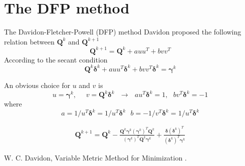 \documentclass{beamer}
\begin{document}
\section{The DFP method}
\begin{frame}{The Davidon-Fletcher-Powell (DFP) method}
Davidon proposed the following relation between $\boldsymbol{Q}^k$ and $\boldsymbol{Q}^{k+1}$
\begin{equation*}
    \boldsymbol{Q}^{k+1} = \boldsymbol{Q}^{k} + a uu^T + bvv^T
\end{equation*}
According to the secant condition
\begin{equation*}
    \boldsymbol{Q}^{k} \boldsymbol{\delta}^k + a uu^T\boldsymbol{\delta}^k + bvv^T\boldsymbol{\delta}^k = \boldsymbol{\gamma}^{k} 
\end{equation*}

An obvious choice for $u$ and $v$ is
\begin{equation*}
    u = \boldsymbol{\gamma}^k,~~~~~~ v=\boldsymbol{Q}^k\boldsymbol{\delta}^k ~~~ \rightarrow 
    ~~~ au^T \boldsymbol{\delta}^k = 1, ~~~bv^T\boldsymbol{\delta}^k = -1
\end{equation*}
where 
\begin{equation*}
    a = 1/u^T \boldsymbol{\delta}^k = 1/u^T \boldsymbol{\delta}^k ~~~
    b = -1/v^T \boldsymbol{\delta}^k = 1/u^T \boldsymbol{\delta}^k
\end{equation*}

\begin{gather*}
    \boldsymbol{Q}^{k+1} = \boldsymbol{Q}^k - \frac{ \boldsymbol{Q}^k \boldsymbol{\gamma}^k (\boldsymbol{\gamma}^k)^T \boldsymbol{Q}^k }
    {(\boldsymbol{\gamma}^k)^T \boldsymbol{Q}^k \boldsymbol{\gamma}^k} 
    + \frac{\boldsymbol{\delta}(\boldsymbol{\delta}^k)^T}{(\boldsymbol{\delta}^k)^T \boldsymbol{\gamma}^k}
\end{gather*}


\begin{thebibliography}{10}
\alert{W. C. Davidon, Variable Metric Method for Minimization}
.

\end{thebibliography}

\end{frame}
\end{document}
